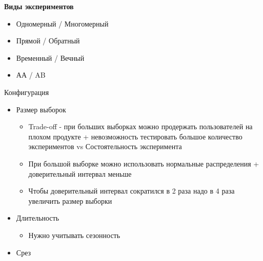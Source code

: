 \documentclass[a4paper, 12pt]{article}
\begin{document}
\textbf{Виды экспериментов}

\begin{itemize}
\item
  
  Одномерный / Многомерный
  
\end{itemize}

\begin{itemize}
\item
  
  Прямой / Обратный
  
\item
  
  Временный / Вечный
  
\item
  
  АА / AB
  
\end{itemize}

{Конфигурация}

\begin{itemize}
\item
  
  Размер выборок
  

  \begin{itemize}
  \item
    
    Trade-off - при больших выборках можно продержать пользователей на
    плохом продукте + невозможность тестировать большое количество
    экспериментов vs Состоятельность эксперимента
    
  \item
    
    При большой выборке можно использовать нормальные распределения +
    доверительный интервал меньше
    
  \item
    
    Чтобы доверительный интервал сократился в 2 раза надо в 4 раза
    увеличить размер выборки
    
  \end{itemize}
\item
  
  Длительность
  

  \begin{itemize}
  \item
    
    Нужно учитывать сезонность
    
  \end{itemize}
\item
  
  Срез
  
\end{itemize}
\end{document}
